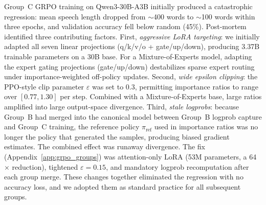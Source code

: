 Group~C GRPO training on Qwen3-30B-A3B initially produced a catastrophic
regression: mean speech length dropped from $\sim$400 words to $\sim$100
words within three epochs, and validation accuracy fell below random
(45\%). Post-mortem identified three contributing factors. First,
\emph{aggressive LoRA targeting}: we initially adapted all seven linear
projections (q/k/v/o + gate/up/down), producing 3.37B trainable parameters
on a 30B base. For a Mixture-of-Experts model, adapting the expert gating
projections (gate/up/down) destabilizes sparse expert routing under
importance-weighted off-policy updates. Second, \emph{wide epsilon clipping}:
the PPO-style clip parameter $\varepsilon$ was set to $0.3$, permitting
importance ratios to range over $[0.77, 1.30]$ per step. Combined with
a Mixture-of-Experts base, large ratios amplified into large output-space
divergence. Third, \emph{stale logprobs}: because Group~B had merged into
the canonical model between Group~B logprob capture and Group~C training,
the reference policy $\pi_{\text{ref}}$ used in importance ratios was
no longer the policy that generated the samples, producing biased
gradient estimates. The combined effect was runaway divergence.
The fix (Appendix~\ref{app:grpo_groups}) was attention-only LoRA (53M
parameters, a 64$\times$ reduction), tightened $\varepsilon = 0.15$, and
mandatory logprob recomputation after each group merge. These changes
together eliminated the regression with no accuracy loss, and we adopted
them as standard practice for all subsequent groups.
